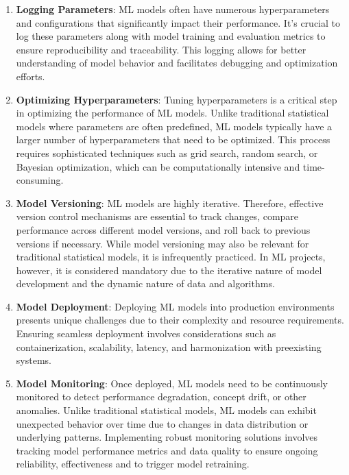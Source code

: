 \begin{enumerate}
    \item \textbf{Logging Parameters}: ML models often have numerous hyperparameters and configurations that significantly impact their performance. It's crucial to log these parameters along with model training and evaluation metrics to ensure reproducibility and traceability. This logging allows for better understanding of model behavior and facilitates debugging and optimization efforts.
    
    \item \textbf{Optimizing Hyperparameters}: Tuning hyperparameters is a critical step in optimizing the performance of ML models. Unlike traditional statistical models where parameters are often predefined, ML models typically have a larger number of hyperparameters that need to be optimized. This process requires sophisticated techniques such as grid search, random search, or Bayesian optimization, which can be computationally intensive and time-consuming.
    
    \item \textbf{Model Versioning}: ML models are highly iterative. Therefore, effective version control mechanisms are essential to track changes, compare performance across different model versions, and roll back to previous versions if necessary. While model versioning may also be relevant for traditional statistical models, it is infrequently practiced. In ML projects, however, it is considered mandatory due to the iterative nature of model development and the dynamic nature of data and algorithms.
    
    \item \textbf{Model Deployment}: Deploying ML models into production environments presents unique challenges due to their complexity and resource requirements. Ensuring seamless deployment involves considerations such as containerization, scalability, latency, and harmonization with preexisting systems.
    
    \item \textbf{Model Monitoring}: Once deployed, ML models need to be continuously monitored to detect performance degradation, concept drift, or other anomalies. Unlike traditional statistical models, ML models can exhibit unexpected behavior over time due to changes in data distribution or underlying patterns. Implementing robust monitoring solutions involves tracking model performance metrics and data quality to ensure ongoing reliability, effectiveness and to trigger model retraining.


\end{enumerate}
